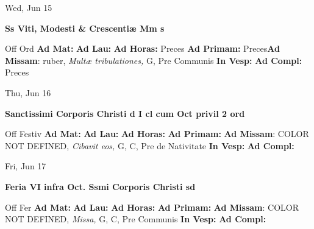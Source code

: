 \documentclass[10pt]{memoir}
\begin{document}
\begin{center}
\begin{minipage}{3.5in}
\vspace{2em}
\begin{center}Wed, Jun 15
\end{center}
\textbf{ \large Ss Viti, Modesti \& Crescentiæ Mm
\textnormal{\normalsize s}}

\begin{justify}Off Ord
\textbf{Ad Mat: }
\textbf{Ad Lau: }
\textbf{Ad Horas: }Preces
\textbf{Ad Primam: }Preces\textbf{Ad Missam}: ruber, \textit{Multæ tribulationes,} G, Pre Communis
\textbf{In Vesp: }
\textbf{Ad Compl: }Preces
\end{justify}
\end{minipage}
\end{center}

\begin{center}
\begin{minipage}{3.5in}
\vspace{2em}
\begin{center}Thu, Jun 16
\end{center}
\textbf{ \large Sanctissimi Corporis Christi
\textnormal{\normalsize d I cl cum Oct privil 2 ord}}

\begin{justify}Off Festiv
\textbf{Ad Mat: }
\textbf{Ad Lau: }
\textbf{Ad Horas: }
\textbf{Ad Primam: }\textbf{Ad Missam}: COLOR NOT DEFINED, \textit{Cibavit eos,} G, C, Pre de Nativitate
\textbf{In Vesp: }
\textbf{Ad Compl: }
\end{justify}
\end{minipage}
\end{center}

\begin{center}
\begin{minipage}{3.5in}
\vspace{2em}
\begin{center}Fri, Jun 17
\end{center}
\textbf{ \large Feria VI infra Oct. Ssmi Corporis Christi
\textnormal{\normalsize sd}}

\begin{justify}Off Fer
\textbf{Ad Mat: }
\textbf{Ad Lau: }
\textbf{Ad Horas: }
\textbf{Ad Primam: }\textbf{Ad Missam}: COLOR NOT DEFINED, \textit{Missa,} G, C, Pre Communis
\textbf{In Vesp: }
\textbf{Ad Compl: }
\end{justify}
\end{minipage}
\end{center}
\end{document}
